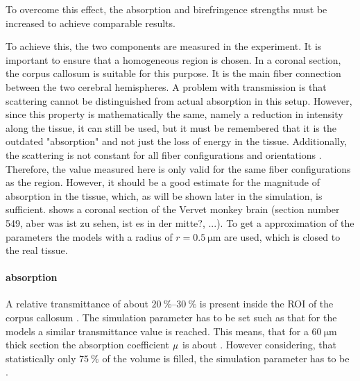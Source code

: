 To overcome this effect, the absorption and birefringence strengths must be increased to achieve comparable results.
\par
% 
To achieve this, the two components are measured in the experiment.
It is important to ensure that a homogeneous region is chosen.
In a coronal section, the corpus callosum is suitable for this purpose. It is the main fiber connection between the two cerebral hemispheres.
A problem with transmission is that scattering cannot be distinguished from actual absorption in this setup.
However, since this property is mathematically the same, namely a reduction in intensity along the tissue, it can still be used, but it must be remembered that it is the outdated "absorption" and not just the loss of energy in the tissue.
Additionally, the scattering is not constant for all fiber configurations and orientations \dummy{}.
Therefore, the value measured here is only valid for the same fiber configurations as the region.
However, it should be a good estimate for the magnitude of absorption in the tissue, which, as will be shown later in the simulation, is sufficient.
% 
 shows a coronal section of the Vervet monkey brain \dummy(section number 549, aber was ist zu sehen, ist es in der mitte?, ...).
% 
To get a approximation of the parameters the models with a radius of $r=\SI{0.5}{\micro\meter}$ are used, which is closed to the real tissue.
% 
% 
% 
\paragraph{absorption}
% 
A relative transmittance of about $\SIrange{20}{30}{\percent}$ is present inside the \ac{ROI} of the corpus callosum . 
The simulation parameter has to be set such as that for the models a similar transmittance value is reached.
This means, that for a $\SI{60}{\micro\meter}$ thick section the absorption coefficient $\textnormal{$\mu$}{}$ is about \dummy{}. However considering, that statistically only $\SI{75}{\percent}$ of the volume is filled, the simulation parameter has to be \dummy{}.
% 

% 
%
% 
